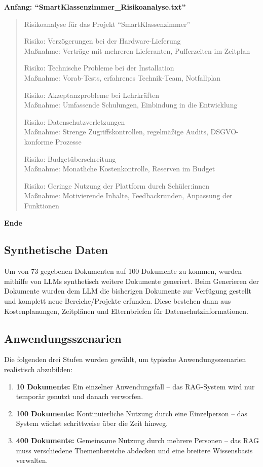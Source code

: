 \textbf{Anfang: \enquote{SmartKlassenzimmer\_Risikoanalyse.txt}}
\begin{quote}
Risikoanalyse für das Projekt \enquote{SmartKlassenzimmer}

Risiko: Verzögerungen bei der Hardware-Lieferung\\
Maßnahme: Verträge mit mehreren Lieferanten, Pufferzeiten im Zeitplan

Risiko: Technische Probleme bei der Installation\\
Maßnahme: Vorab-Tests, erfahrenes Technik-Team, Notfallplan

Risiko: Akzeptanzprobleme bei Lehrkräften\\
Maßnahme: Umfassende Schulungen, Einbindung in die Entwicklung

Risiko: Datenschutzverletzungen\\
Maßnahme: Strenge Zugriffskontrollen, regelmäßige Audits, DSGVO-konforme Prozesse

Risiko: Budgetüberschreitung\\
Maßnahme: Monatliche Kostenkontrolle, Reserven im Budget

Risiko: Geringe Nutzung der Plattform durch Schüler:innen\\
Maßnahme: Motivierende Inhalte, Feedbackrunden, Anpassung der Funktionen
\end{quote}
\textbf{Ende}


\subsection{Synthetische Daten}
Um von 73 gegebenen Dokumenten auf 100 Dokumente zu kommen, wurden mithilfe von LLMs synthetisch weitere Dokumente generiert.
Beim Generieren der Dokumente wurden dem LLM die bisherigen Dokumente zur Verfügung gestellt und komplett neue Bereiche/Projekte erfunden. Diese bestehen dann aus Kostenplanungen, Zeitplänen und Elternbriefen für Datenschutzinformationen.

\subsection{Anwendungsszenarien}
Die folgenden drei Stufen wurden gewählt, um typische Anwendungsszenarien realistisch abzubilden:
\begin{enumerate}
    \item \textbf{10 Dokumente:} Ein einzelner Anwendungsfall – das RAG-System wird nur temporär genutzt und danach verworfen.
    \item \textbf{100 Dokumente:} Kontinuierliche Nutzung durch eine Einzelperson – das System wächst schrittweise über die Zeit hinweg.
    \item \textbf{400 Dokumente:} Gemeinsame Nutzung durch mehrere Personen – das RAG muss verschiedene Themenbereiche abdecken und eine breitere Wissensbasis verwalten.
\end{enumerate}


